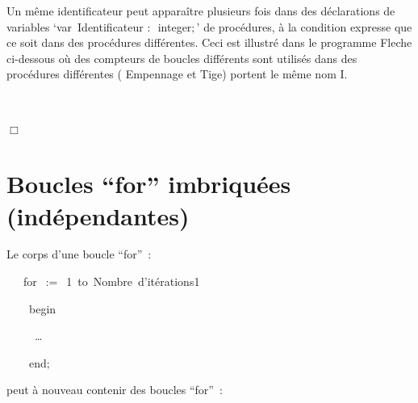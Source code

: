 Un même identificateur peut apparaître plusieurs fois
dans des dé\-cla\-ra\-tions de va\-ria\-bles 
`{\mcl var}\ {\small\rm Identificateur} $:$\ {\idt integer}$;$'
de procédures, à la condition expresse que ce soit dans des procédures
différentes. Ceci est illustré dans le programme
{\idt Fleche} ci-dessous où des compteurs de boucles
différents sont utilisés dans des procédures différentes ({\idt
Empennage} et {\idt Tige}) portent le même nom {\idt I}.

\begin{exemple}[Flèche]{\rm \ \\[7cm]
%
\vspace*{-7cm}%

\noindent $\Box$ }\end{exemple}


\section{Boucles ``for'' imbriquées (in\-dé\-pen\-dan\-tes)} 

Le corps d'une boucle ``for''~:

\mbox{\blc\ \ \ {\mcl for}\hspace{0.3em}\blanc\hspace{0.3em}{\small\rm Identificateur1}\ $:=$\ 1\hspace{0.3em}\blanc\hspace{0.3em}
{\mcl to}\hspace{0.3em}\blanc\hspace{0.3em} {\small\rm Nombre d'itérations1} \hspace{0.3em}\blanc\hspace{0.3em}{\mcl do}}\par 
\mbox{\blc\ \ \ \ \mcl begin}\par 
\mbox{\blc\ \ \ \ \ \small\rm  \ldots}\par 
\mbox{\blc\ \ \ \ {\mcl end}\idt$;$}\par 

\noindent peut à nouveau contenir des boucles ``for''~:

